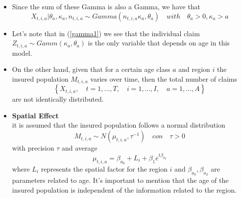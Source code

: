 \documentclass[10pt]{beamer} %
\begin{document}
\begin{frame}
\begin{itemize}
    \item Since the sum of these Gamma is also a Gamma, we have that 
    $$X_{t,i,a}|\theta_a,\kappa_a,n_{t,i,a}\sim Gamma(n_{t,i,a}\kappa_a,\theta_a)\quad with\quad \theta_a>0,\kappa_a>a$$
    \item Let's note that in (\ref{gamma1}) we see that the individual claim $Z_{t,i,a}\sim Gamm(\kappa_a,\theta_a)$ is the only variable that depends on age in this model.\\
    \item On the other hand, given that for a certain age class $a$ and region $i$ the insured population $M_ {t, i, a}$ varies over time, then the total number of claims $$\left\{X_{t, i, a},\quad t = 1, ..., T,\quad i = 1, ..., I,\quad a = 1, ..., A\right\}$$ are not identically distributed.
\end{itemize}
    
\end{frame}
\begin{frame}
\begin{itemize}
    \item \textbf{Spatial Effect}\\
    it is assumed that the insured population follows a normal distribution $$M_{t,i,a}\sim N(\mu_{t,i,a},\tau^{-1})\quad con \quad \tau>0$$ with precision $\tau$ and average 
\begin{equation}
	\label{mu_t,i,a}
	\mu_{t,i,a}=\beta_{a_0}+L_i+\beta_{1}e^{t\beta_{a_2}}
\end{equation}
 where $L_i$ represents the spatial factor for the region $i$ and $\beta_{a_0},\beta_{a_2}$ are parameters related to age. It's important to mention that the age of the insured population is independent of the information related to the region. 
\end{itemize}
    
\end{frame}
\end{document}
